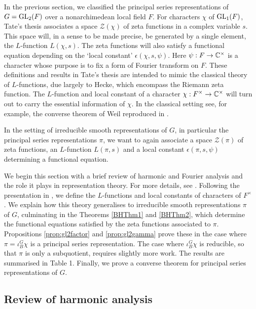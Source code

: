 In the previous section, we classified the principal series representations of $G=\mathrm{GL}_2(F)$ over a nonarchimedean local field $F$. For characters $\chi$ of $\mathrm{GL}_1(F)$, Tate's thesis \cite{Tate} associates a space $\mathcal Z(\chi)$ of zeta functions in a complex variable $s$. This space will, in a sense to be made precise, be generated by a single element, the $L$-function $L(\chi,s)$. The zeta functions will also satisfy a functional equation depending on the `local constant' $\epsilon(\chi,s,\psi)$. Here $\psi :F \to \mathbb{C}^\times$ is a character whose purpose is to fix a form of Fourier transform on $F$. These definitions and results in Tate's thesis are intended to mimic the classical theory of $L$-functions, due largely to Hecke, which encompass the Riemann zeta function. The $L$-function and local constant of a character $\chi:F^\times \to \mathbb{C}^\times$ will turn out to carry the essential information of $\chi$. In the classical setting see, for example, the converse theorem of Weil reproduced in \cite[Theorem 1.5.1]{Bump}.

In the setting of irreducible smooth representations of $G$, in particular the principal series representations $\pi$, we want to again associate a space $\mathcal Z(\pi)$ of zeta functions, an $L$-function $L(\pi,s)$ and a local constant $\epsilon(\pi,s,\psi)$ determining a functional equation. 

We begin this section with a brief review of harmonic and Fourier analysis and the role it plays in representation theory. For more details, see \cite[Chapter 3.1]{Bump}. Following the presentation in \cite{BH1}, we define the $L$-functions and local constants of characters of $F^\times$. We explain how this theory generalises to irreducible smooth representations $\pi$ of $G$, culminating in the Theorems \ref{BHThm1} and \ref{BHThm2}, which determine the functional equations satisfied by the zeta functions associated to $\pi$. Propositions \ref{prop:gl2factor} and \ref{prop:gl2gamma} prove these in the case where $\pi = \iota_B^G \chi$ is a principal series representation. The case where $\iota_B^G \chi$ is reducible, so that $\pi$ is only a subquotient, requires slightly more work. The results are summarised in Table 1. Finally, we prove a converse theorem for principal series representations of $G$.


\subsection{Review of harmonic analysis}

